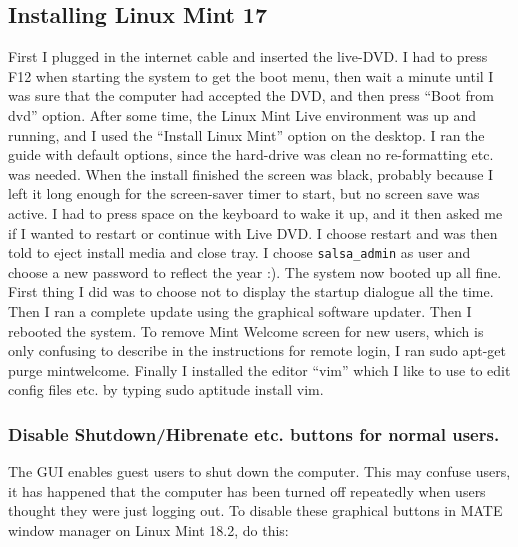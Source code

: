 \subsection{Installing Linux Mint 17}
First I plugged in the internet cable and inserted the live-DVD. I had to press
F12 when starting the system to get the boot menu, then wait a minute until I
was sure that the computer had accepted the DVD, and then press “Boot from dvd”
option. After some time, the Linux Mint Live environment was up and running,
and I used the “Install Linux Mint” option on the desktop. I ran the guide with
default options, since the hard-drive was clean no re-formatting etc. was
needed. When the install finished the screen was black, probably because I left
it long enough for the screen-saver timer to start, but no screen save was
active. I had to press space on the keyboard to wake it up, and it then asked
me if I wanted to restart or continue with Live DVD. I choose restart and was
then told to eject install media and close tray. I choose \verb!salsa_admin! as user
and choose a new password to reflect the year :). The system now booted up all
fine. First thing I did was to choose not to display the startup dialogue all
the time. Then I ran a complete update using the graphical software updater.
Then I rebooted the system. To remove Mint Welcome screen for new users, which
is only confusing to describe in the instructions for remote login, I ran sudo
apt-get purge mintwelcome. Finally I installed the editor “vim” which I like to
use to edit config files etc. by typing sudo aptitude install vim. 

\subsubsection{Disable Shutdown/Hibrenate etc. buttons for normal users.}
The GUI enables guest users to shut down the computer. This may confuse
users, it has happened that the computer has been turned off repeatedly
when users thought they were just logging out. To disable these graphical
buttons in MATE window manager on Linux Mint 18.2, do this:

